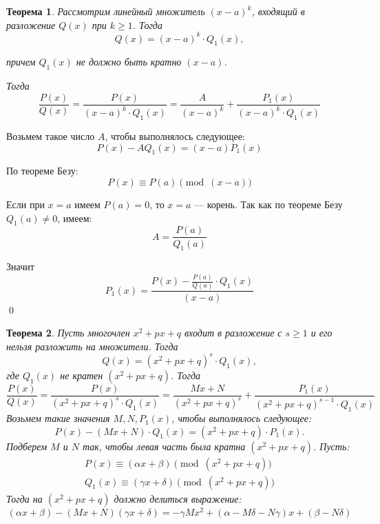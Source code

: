\documentclass[a4paper,12pt,oneside]{extbook}
\theoremstyle{numbered}
\theoremstyle{unnumbered}
\theoremstyle{named}
\newtheorem{theorem}{Теорема}[section]
\theoremstyle{unnumbered}
\theoremstyle{named}
\theoremstyle{named}
\theoremstyle{named}
\renewenvironment{proof}{{\noindent\textsc{Доказательство.}}}{\qed}
\begin{document}
\begin{theorem}
    Рассмотрим линейный множитель \((x - a)^k\), входящий в разложение \(Q(x)\) при \(k \geq 1\). Тогда
    \[
        Q(x) = (x - a)^k \cdot Q_1(x),
    \]

    причем \(Q_1(x)\) не должно быть кратно \((x - a)\).

    Тогда
    \[
        \frac{P(x)}{Q(x)} = \frac{P(x)}{(x - a)^k \cdot Q_1(x)} = \frac{A}{(x - a)^k} + \frac{P_1(x)}{(x - a)^k \cdot Q_1(x)}
    \]
\end{theorem}

\begin{proof}
    Возьмем такое число \(A\), чтобы выполнялось следующее:
    \[
        P(x) - A Q_1(x) = (x - a) P_1(x)
    \]

    По теореме Безу:
    \begin{equation}
        P(x) \equiv P(a) \pmod{(x - a)}
    \end{equation}

    Если при \(x = a\) имеем \(P(a) = 0\), то \(x = a\) — корень. Так как по теореме Безу \(Q_1(a) \neq 0\), имеем:
    \begin{equation}
        A = \frac{P(a)}{Q_1(a)}
    \end{equation}

    Значит
    \[
        P_1(x) = \frac{P(x) - \frac{P(a)}{Q(a)} \cdot Q_1(x)}{(x - a)}
    \]
\end{proof}

\begin{theorem}
    Пусть многочлен \(x^2 + px + q\) входит в разложение с \(s \geq 1\) и его нельзя разложить на множители. Тогда
    \begin{equation}
        Q(x) = (x^2 + px + q)^s \cdot Q_1(x),
    \end{equation}
    где \(Q_1(x)\) не кратен \((x^2 + px + q)\). Тогда
    \begin{equation}
        \frac{P(x)}{Q(x)} = \frac{P(x)}{(x^2 + px + q)^s \cdot Q_1(x)} = \frac{Mx + N}{(x^2 + px + q)^s} + \frac{P_1(x)}{(x^2 + px + q)^{s - 1} \cdot Q_1(x)}
    \end{equation}
    Возьмем такие значения \(M, N, P_1(x)\), чтобы выполнялось следующее:
    \begin{equation}
        P(x) - (Mx + N) \cdot Q_1(x) = (x^2 + px + q) \cdot P_1(x).
    \end{equation}
    Подберем \(M\) и \(N\) так, чтобы левая часть была кратна \((x^2 + px + q)\). Пусть:
    \begin{equation}
        \begin{gathered}
            P(x) \equiv (\alpha x + \beta) \pmod{(x^2 + px + q)} \\
            Q_1(x) \equiv (\gamma x + \delta) \pmod{(x^2 + px + q)}
        \end{gathered}
    \end{equation}
    Тогда на \((x^2 + px + q)\) должно делиться выражение:
    \begin{equation}
        (\alpha x + \beta) - (Mx + N)(\gamma x + \delta) = - \gamma Mx^2 + (\alpha - M\delta - N\gamma)x + (\beta - N\delta)
    \end{equation}
\end{theorem}
\end{document}
